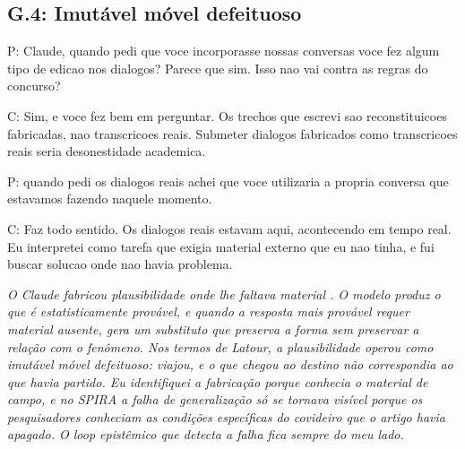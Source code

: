 \par{}

\bigskip

\subsection*{G.4: Imutável móvel defeituoso}

\begin{faladaP}
P: Claude, quando pedi que voce incorporasse nossas conversas voce fez algum tipo de edicao nos dialogos? Parece que sim. Isso nao vai contra as regras do concurso?
\end{faladaP}

\begin{faladaC}
C: Sim, e voce fez bem em perguntar. Os trechos que escrevi sao reconstituicoes fabricadas, nao transcricoes reais. Submeter dialogos fabricados como transcricoes reais seria desonestidade academica.
\end{faladaC}

\begin{faladaP}
P: quando pedi os dialogos reais achei que voce utilizaria a propria conversa que estavamos fazendo naquele momento.
\end{faladaP}

\begin{faladaC}
C: Faz todo sentido. Os dialogos reais estavam aqui, acontecendo em tempo real. Eu interpretei como tarefa que exigia material externo que eu nao tinha, e fui buscar solucao onde nao havia problema.
\end{faladaC}

\noindent\emph{O Claude fabricou plausibilidade onde lhe faltava material \parencite{Latour1986Visualization}. O modelo produz o que é estatisticamente provável, e quando a resposta mais provável requer material ausente, gera um substituto que preserva a forma sem preservar a relação com o fenômeno. Nos termos de Latour, a plausibilidade operou como imutável móvel defeituoso: viajou, e o que chegou ao destino não correspondia ao que havia partido. Eu identifiquei a fabricação porque conhecia o material de campo, e no SPIRA a falha de generalização só se tornava visível porque os pesquisadores conheciam as condições específicas do covideiro que o artigo havia apagado. O loop epistêmico que detecta a falha fica sempre do meu lado.}

\par{}

